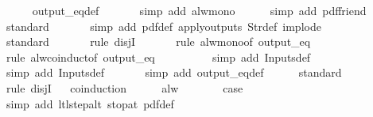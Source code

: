 \begin{isabellebody}
\ \ \ \ \isamarkupfalse%
\ output_eq{\isacharunderscore}def\isanewline
\ \ \ \ \ \isamarkupfalse%
\ {\isacharparenleft}simp\ add{\isacharcolon}\ alw{\isacharunderscore}mono{\isacharparenright}\isanewline
\ \ \ \ \isamarkupfalse%
\ {\isacharparenleft}simp\ add{\isacharcolon}\ pdf{\isacharunderscore}friend{\isacharparenright}\isanewline
\ \ \ \ \isamarkupfalse%
\ standard\isanewline
\ \ \ \ \ \isamarkupfalse%
\ {\isacharparenleft}simp\ add{\isacharcolon}\ pdf{\isacharunderscore}def\ apply{\isacharunderscore}outputs\ Str{\isacharunderscore}def\ implode{\isacharparenright}\isanewline
\ \ \ \ \ \isamarkupfalse%
\ standard\isanewline
\ \ \ \ \ \isamarkupfalse%
\ {\isacharparenleft}rule\ disjI{}{\isacharparenright}\isanewline
\ \ \ \ \ \isamarkupfalse%
\ {\isacharparenleft}rule\ alw{\isacharunderscore}mono{\isacharbrackleft}of\ {\isachardoublequoteopen}output_eq\ {\isacharbrackleft}{\isacharbrackright}{\isachardoublequoteclose}{\isacharbrackright}{\isacharparenright}\isanewline
\ \ \ \ \ \ \isamarkupfalse%
\ {\isacharparenleft}rule\ alw{\isachardot}coinduct{\isacharbrackleft}of\ {\isachardoublequoteopen}output_eq\ {\isacharbrackleft}{\isacharbrackright}{\isachardoublequoteclose}{\isacharbrackright}{\isacharparenright}\isanewline
\ \ \ \ \ \ \ \isamarkupfalse%
\ {\isacharparenleft}simp\ add{\isacharcolon}\ Inputs{\isacharunderscore}def{\isacharparenright}\isanewline
\ \ \ \ \ \ \isamarkupfalse%
\ {\isacharparenleft}simp\ add{\isacharcolon}\ Inputs{\isacharunderscore}def{\isacharparenright}\isanewline
\ \ \ \ \ \isamarkupfalse%
\ {\isacharparenleft}simp\ add{\isacharcolon}\ output_eq{\isacharunderscore}def{\isacharparenright}\isanewline
\ \ \ \ \isamarkupfalse%
\ standard\isanewline
\ \ \ \ \isamarkupfalse%
\ {\isacharparenleft}rule\ disjI{}{\isacharparenright}\isanewline
\ \ \isamarkupfalse%
{\isacharparenleft}coinduction{\isacharparenright}\isanewline
\ \ \ \ \isamarkupfalse%
\ alw\isanewline
\ \ \ \ \isamarkupfalse%
\ \isamarkupfalse%
\ {\isacharquery}case\isanewline
\ \ \ \ \ \ \isamarkupfalse%
\ {\isacharparenleft}simp\ add{\isacharcolon}\ ltl{\isacharunderscore}step{\isacharunderscore}alt\ stop{\isacharunderscore}at{\isacharunderscore}{}\ pdf{\isacharunderscore}def{\isacharparenright}\isanewline

\end{isabellebody}

